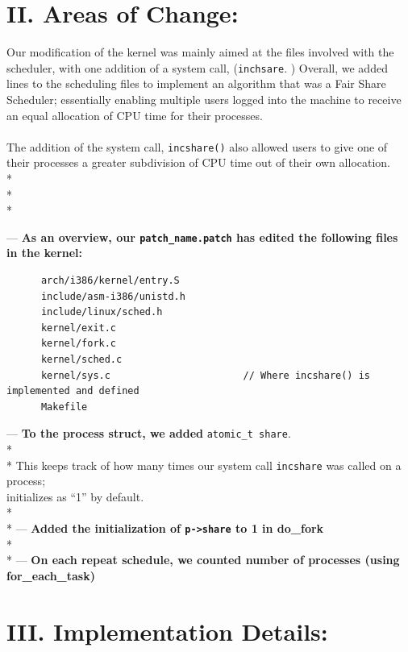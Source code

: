 \documentclass[10pt]{article}
\begin{document}
\section{II. Areas of Change:}

Our modification of the kernel was mainly aimed at the files involved with the scheduler, with one addition of a system call, (\texttt{inchsare}. ) Overall, we added lines to the scheduling files to implement an algorithm that was a Fair Share Scheduler; essentially enabling multiple users logged into the machine to receive an equal allocation of CPU time for their processes. \\ \\

The addition of the system call, \texttt{incshare()} also allowed users to give one of their processes a greater subdivision of CPU time out of their own allocation. \\* \\* \\*

--- {\bfseries As an overview, our \texttt{patch\_name.patch} has edited the following files in the kernel:}
\begin{verbatim}
      arch/i386/kernel/entry.S
      include/asm-i386/unistd.h
      include/linux/sched.h
      kernel/exit.c
      kernel/fork.c
      kernel/sched.c
      kernel/sys.c                       // Where incshare() is implemented and defined
      Makefile
\end{verbatim}
--- {\bfseries To the process struct, we added} \texttt{atomic\_t share}. \\* \\*
\hspace*{36pt} This keeps track of how many times our system call \texttt{incshare} was
called on a process; \\ 
\hspace*{36pt} initializes as ``1'' by default. \\* \\* 
--- {\bfseries Added the initialization of \texttt{p-\textgreater share} to 1 in do\_fork} \\* \\*
--- {\bfseries On each repeat schedule, we counted number of processes (using for\_each\_task)}


\section{III. Implementation Details:}
\end{document}

